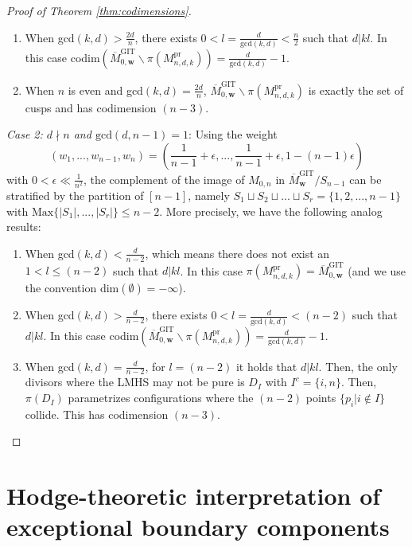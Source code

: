 \documentclass[12pt, letterpaper]{amsart}
\theoremstyle{plain}
\theoremstyle{definition}
\begin{document}
\begin{proof}[Proof of Theorem \ref{thm:codimensions}]
\begin{enumerate}
\item When gcd$(k,d)>\frac{2d}{n}$, there exists $0<l=\frac{d}{\mathrm{gcd}(k,d)}<\frac{n}{2}$ such that $d|kl$. In this case codim$(\overline{M}_{0,\mathbf{w}}^{\mathrm{GIT}}\backslash \pi(M_{n,d,k}^{\mathrm{pr}}))=\frac{d}{\mathrm{gcd}(k,d)}-1$.

\item When $n$ is even and gcd$(k,d)=\frac{2d}{n}$, $\overline{M}_{0,\mathbf{w}}^{\mathrm{GIT}}\backslash \pi(M_{n,d,k}^{\mathrm{pr}})$ is exactly the set of cusps and has codimension $(n-3)$. 


\end{enumerate}


\noindent\textit{Case 2: $d\nmid n$  and $\mathrm{gcd}(d,n-1)=1$}: Using the weight 
\[
(w_1,...,w_{n-1},w_{n})= \left( \frac{1}{n-1}+\epsilon,...,\frac{1}{n-1}+\epsilon, 1-(n -1) \epsilon \right)
\]
with $0< \epsilon \ll \frac{1}{n^2}$, the complement of the image of $M_{0,n}$ in $\overline{M}^{\mathrm{GIT}}_{\mathbf{w}}/S_{n-1}$ 
can be stratified by the partition of $[n-1]$, namely $S_1\sqcup S_2\sqcup ... \sqcup S_r=\{1,2,...,n-1\}$ with $\mathrm{Max}\{|S_1|,...,|S_r|\}\leq 
n-2$.  More precisely, we have the following analog results:
\begin{enumerate}
    
\item When gcd$(k,d)<\frac{d}{n-2}$, which means there does not exist an $1<l\leq (n-2)$ such that $d|kl$. In this case $\pi(M_{n,d,k}^{\mathrm{pr}})=
\overline{M}_{0,\mathbf{w}}^{\mathrm{GIT}}$ (and we use the convention dim$(\emptyset)=-\infty$).

\item When gcd$(k,d)>\frac{d}{n-2}$, there exists $0<l=\frac{d}{\mathrm{gcd}(k,d)}< (n-2)$ such that $d|kl$. In this case codim$(\overline{M}_{0,\mathbf{w}}^{\mathrm{GIT}}\backslash \pi(M_{n,d,k}^{\mathrm{pr}}))=\frac{d}{\mathrm{gcd}(k,d)}-1$.

\item When gcd$(k,d)=\frac{d}{n-2}$, for $l=(n-2)$ it holds that $d | kl$. Then, the only divisors where the LMHS may not be pure is $D_{I}$ with $I^c = \{ i,n \}$. Then, $\pi(D_I)$ parametrizes configurations where the $(n-2)$ points $\{ p_i | i \notin I \}$ collide. This has codimension $(n-3)$. 
\end{enumerate}
\end{proof}




\section{Hodge-theoretic interpretation of exceptional boundary components}
\end{document}
